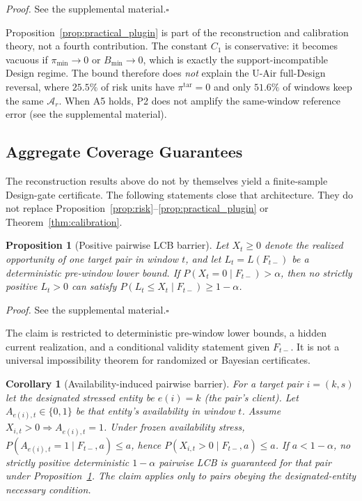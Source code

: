 \documentclass[letterpaper,journal]{IEEEtran}
\newtheorem{proposition}{Proposition}
\newtheorem{corollary}{Corollary}
\begin{document}
\noindent\emph{Proof.}
See the supplemental material.\hfill$\square$

Proposition~\ref{prop:practical_plugin} is part of the reconstruction
and calibration theory, not a fourth contribution.  The constant
$C_1$ is conservative: it becomes vacuous if $\pi_{\min}\to0$ or
$B_{\min}\to0$, which is exactly the support-incompatible Design regime.
The bound therefore does \emph{not} explain the U-Air full-Design
reversal, where $25.5\%$ of risk units have $\pi^{\mathrm{tar}}=0$ and
only $51.6\%$ of windows keep the same $\mathcal{A}_r$.  When A5 holds,
P2 does not amplify the same-window reference error
(see the supplemental material).

\subsection{Aggregate Coverage Guarantees}
\label{subsec:agg_coverage_theory}

The reconstruction results above do not by themselves yield a finite-sample
Design-gate certificate.  The following statements close that architecture.
They do not replace Proposition~\ref{prop:risk}--\ref{prop:practical_plugin}
or Theorem~\ref{thm:calibration}.

\begin{proposition}[Positive pairwise LCB barrier]
\label{prop:pairwise-lcb-barrier}
Let $X_t\ge 0$ denote the realized opportunity of one target pair in window
$t$, and let $L_t=L(F_{t-})$ be a deterministic pre-window lower bound.  If
$P(X_t=0\mid F_{t-})>\alpha$, then no strictly positive $L_t>0$ can satisfy
$P(L_t\le X_t\mid F_{t-})\ge 1-\alpha$.
\end{proposition}

\noindent\emph{Proof.}
See the supplemental material.\hfill$\square$

The claim is restricted to deterministic pre-window lower bounds, a hidden
current realization, and a conditional validity statement given $F_{t-}$.  It
is not a universal impossibility theorem for randomized or Bayesian
certificates.

\begin{corollary}[Availability-induced pairwise barrier]
\label{cor:availability-barrier}
For a target pair $i=(k,s)$ let the designated stressed entity be $e(i)=k$
(the pair's client).  Let $A_{e(i),t}\in\{0,1\}$ be that entity's availability
in window $t$.  Assume $X_{i,t}>0\Rightarrow A_{e(i),t}=1$.  Under frozen
availability stress, $P(A_{e(i),t}=1\mid F_{t-},a)\le a$, hence
$P(X_{i,t}>0\mid F_{t-},a)\le a$.  If $a<1-\alpha$, no strictly positive
deterministic $1-\alpha$ pairwise LCB is guaranteed for that pair under
Proposition~\ref{prop:pairwise-lcb-barrier}.  The claim applies only to pairs
obeying the designated-entity necessary condition.
\end{corollary}
\end{document}
